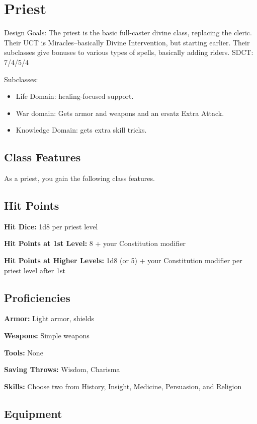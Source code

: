 \section{Priest\label{class:priest}}

Design Goals: The priest is the basic full-caster divine class, replacing the cleric. Their UCT is Miracles--basically Divine Intervention, but starting earlier. Their subclasses give bonuses to various types of spells, basically adding riders. SDCT: 7/4/5/4

Subclasses:
\begin{itemize}
	\item Life Domain: healing-focused support.
	\item War domain: Gets armor and weapons and an ersatz Extra Attack.
	\item Knowledge Domain: gets extra skill tricks.
\end{itemize}

\subsection{Class Features}

As a priest, you gain the following class features.

\subsection{Hit Points}

\textbf{Hit Dice:} 1d8 per priest level

\textbf{Hit Points at 1st Level:} 8 + your Constitution modifier

\textbf{Hit Points at Higher Levels:} 1d8 (or 5) + your Constitution modifier per priest level after 1st

\subsection{Proficiencies}

\textbf{Armor:} Light armor, shields

\textbf{Weapons:} Simple weapons

\textbf{Tools:} None

\textbf{Saving Throws:} Wisdom, Charisma

\textbf{Skills:} Choose two from History, Insight, Medicine, Persuasion, and Religion

\subsection{Equipment}

